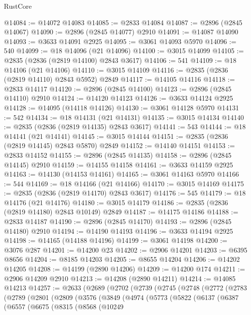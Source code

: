 \begin{lexlean}{RustCore}
\begin{coremodule}
@14084 := @14072 @14083
@14085 := @2833 @14084
@14087 := @2896 (@2845 @14067)
@14090 := @2896 (@2845 @14077) @2910
@14091 := @14087 @14090
@14093 := @3633 @14091 @2925
@14095 := @3061 @14093 @5970
@14096 := 540
@14099 := @18 @14096 (@21 @14096)
@14100 := @3015 @14099
@14105 := @2835 (@2836 (@2819 @14100) @2843 @3617)
@14106 := 541
@14109 := @18 @14106 (@21 @14106)
@14110 := @3015 @14109
@14116 := @2835 (@2836 (@2819 @14110) @2843 @5952) @2849
@14117 := @14105 @14116
@14118 := @2833 @14117
@14120 := @2896 (@2845 @14100)
@14123 := @2896 (@2845 @14110) @2910
@14124 := @14120 @14123
@14126 := @3633 @14124 @2925
@14128 := @14095 (@14118 @14126)
@14130 := @3061 @14128 @5970
@14131 := 542
@14134 := @18 @14131 (@21 @14131)
@14135 := @3015 @14134
@14140 := @2835 (@2836 (@2819 @14135) @2843 @3617)
@14141 := 543
@14144 := @18 @14141 (@21 @14141)
@14145 := @3015 @14144
@14151 := @2835 (@2836 (@2819 @14145) @2843 @5870) @2849
@14152 := @14140 @14151
@14153 := @2833 @14152
@14155 := @2896 (@2845 @14135)
@14158 := @2896 (@2845 @14145) @2910
@14159 := @14155 @14158
@14161 := @3633 @14159 @2925
@14163 := @14130 (@14153 @14161)
@14165 := @3061 @14163 @5970
@14166 := 544
@14169 := @18 @14166 (@21 @14166)
@14170 := @3015 @14169
@14175 := @2835 (@2836 (@2819 @14170) @2843 @3617)
@14176 := 545
@14179 := @18 @14176 (@21 @14176)
@14180 := @3015 @14179
@14186 := @2835 (@2836 (@2819 @14180) @2843 @10149) @2849
@14187 := @14175 @14186
@14188 := @2833 @14187
@14190 := @2896 (@2845 @14170)
@14193 := @2896 (@2845 @14180) @2910
@14194 := @14190 @14193
@14196 := @3633 @14194 @2925
@14198 := @14165 (@14188 @14196)
@14199 := @3061 @14198
@14200 := @3076 @287
@14201 := @14200 @23
@14202 := @2906 @14201
@14203 := @6395 @8656
@14204 := @8185 @14203
@14205 := @8655 @14204
@14206 := @14202 @14205
@14208 := @14199 (@2890 @14206)
@14209 := @14200 @174
@14211 := @2906 @14209 @2910
@14213 := @14208 (@2890 @14211)
@14214 := @14085 @14213
@14257 := @2633
    (@2689
      (@2702
        (@2739
          (@2745
            (@2748
              (@2772
                (@2783
                  (@2789
                    (@2801
                      (@2809
                        (@3576
                          (@3849
                            (@4974
                              (@5773
                                (@5822
                                  (@6137
                                    (@6387
                                      (@6557
                                        (@6675
                                          (@8315
                                            (@8568
                                              (@10249

\end{coremodule}
\end{lexlean}
